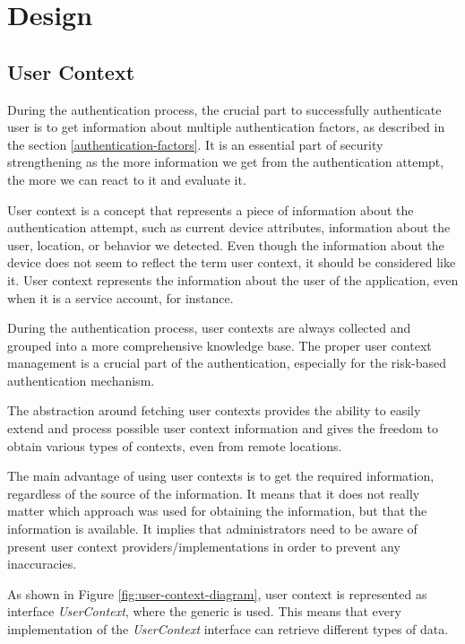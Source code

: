 \chapter{Design}

\section{User Context}
During the authentication process, the crucial part to successfully authenticate user is to get information about multiple authentication factors, as described in the section \ref{authentication-factors}.
It is an essential part of security strengthening as the more information we get from the authentication attempt, the more we can react to it and evaluate it.

User context is a concept that represents a piece of information about the authentication attempt, such as current device attributes, information about the user, location, or behavior we detected.
Even though the information about the device does not seem to reflect the term user context, it should be considered like it.
User context represents the information about the user of the application, even when it is a service account, for instance.

During the authentication process, user contexts are always collected and grouped into a more comprehensive knowledge base.
The proper user context management is a crucial part of the authentication, especially for the risk-based authentication mechanism.

The abstraction around fetching user contexts provides the ability to easily extend and process possible user context information and gives the freedom to obtain various types of contexts, even from remote locations.

The main advantage of using user contexts is to get the required information, regardless of the source of the information.
It means that it does not really matter which approach was used for obtaining the information, but that the information is available.
It implies that administrators need to be aware of present user context providers/implementations in order to prevent any inaccuracies.

\newpage

As shown in Figure \ref{fig:user-context-diagram}, user context is represented as interface \textit{UserContext}, where the generic is used.
This means that every implementation of the \textit{UserContext} interface can retrieve different types of data.

